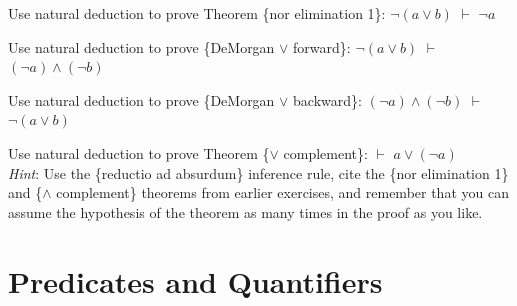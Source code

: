 {{\begin{ExerciseList}
\Exercise
Use natural deduction to prove
Theorem \{nor elimination 1\}: $\neg (a \vee b)$ $\vdash$ $\neg a$

\Exercise
Use natural deduction to prove \{DeMorgan $\vee$ forward\}:
$\neg (a \vee b)$ $\vdash$ $(\neg a) \wedge (\neg b)$

\Exercise
Use natural deduction to prove \{DeMorgan $\vee$ backward\}:
$(\neg a) \wedge (\neg b)$ $\vdash$ $\neg (a \vee b)$

\Exercise
Use natural deduction to prove
Theorem \{$\vee$ complement\}: $\vdash$ $a \vee (\neg a)$ \\
\emph{Hint}: Use the \{reductio ad absurdum\} inference rule,
cite the \{nor elimination 1\} and \{$\wedge$ complement\}
theorems from earlier exercises,
and remember that you can assume the hypothesis
of the theorem as many times in the proof as you like.

\end{ExerciseList}


\section{Predicates and Quantifiers}
\label{sec:predicates-and-quantifiers}

}}
